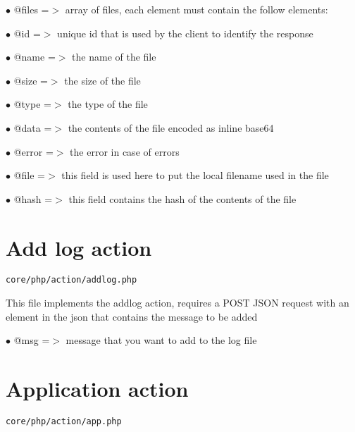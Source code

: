 \documentclass[a4paper]{book}
\begin{document}
\begin{compactitem}
\item[\color{myblue}$\bullet$] @files =$>$ array of files, each element must contain the follow elements:
\item[\color{myblue}$\bullet$] @id    =$>$ unique id that is used by the client to identify the response
\item[\color{myblue}$\bullet$] @name  =$>$ the name of the file
\item[\color{myblue}$\bullet$] @size  =$>$ the size of the file
\item[\color{myblue}$\bullet$] @type  =$>$ the type of the file
\item[\color{myblue}$\bullet$] @data  =$>$ the contents of the file encoded as inline base64
\item[\color{myblue}$\bullet$] @error =$>$ the error in case of errors
\item[\color{myblue}$\bullet$] @file  =$>$ this field is used here to put the local filename used in the file
\item[\color{myblue}$\bullet$] @hash  =$>$ this field contains the hash of the contents of the file
\end{compactitem}

\hypertarget{toc4}{}
\section{Add log action}

\begin{lstlisting}
core/php/action/addlog.php
\end{lstlisting}

This file implements the addlog action, requires a POST JSON request
with an element in the json that contains the message to be added

\begin{compactitem}
\item[\color{myblue}$\bullet$] @msg =$>$ message that you want to add to the log file
\end{compactitem}

\hypertarget{toc5}{}
\section{Application action}

\begin{lstlisting}
core/php/action/app.php
\end{lstlisting}
\end{document}
